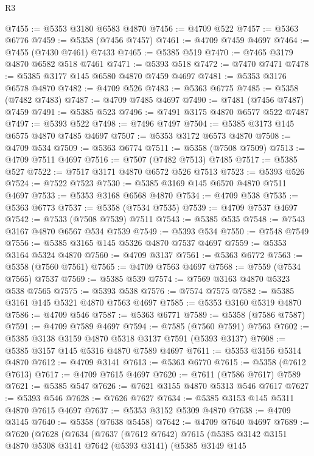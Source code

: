 \begin{lexlean}{R3}
\begin{coremodule}
@7455 := @5353 @3180 @6583 @4870
@7456 := @4709 @522
@7457 := @5363 @6776
@7459 := @5358 (@7456 @7457)
@7461 := @4709 @7459 @4697
@7464 := @7455 (@7430 @7461) @7433
@7465 := @5385 @519
@7470 := @7465 @3179 @4870 @6582 @518 @7461
@7471 := @5393 @518
@7472 := @7470 @7471
@7478 := @5385 @3177 @145 @6580 @4870 @7459 @4697
@7481 := @5353 @3176 @6578 @4870
@7482 := @4709 @526
@7483 := @5363 @6775
@7485 := @5358 (@7482 @7483)
@7487 := @4709 @7485 @4697
@7490 := @7481 (@7456 @7487) @7459
@7491 := @5385 @523
@7496 := @7491 @3175 @4870 @6577 @522 @7487
@7497 := @5393 @522
@7498 := @7496 @7497
@7504 := @5385 @3173 @145 @6575 @4870 @7485 @4697
@7507 := @5353 @3172 @6573 @4870
@7508 := @4709 @534
@7509 := @5363 @6774
@7511 := @5358 (@7508 @7509)
@7513 := @4709 @7511 @4697
@7516 := @7507 (@7482 @7513) @7485
@7517 := @5385 @527
@7522 := @7517 @3171 @4870 @6572 @526 @7513
@7523 := @5393 @526
@7524 := @7522 @7523
@7530 := @5385 @3169 @145 @6570 @4870 @7511 @4697
@7533 := @5353 @3168 @6568 @4870
@7534 := @4709 @538
@7535 := @5363 @6773
@7537 := @5358 (@7534 @7535)
@7539 := @4709 @7537 @4697
@7542 := @7533 (@7508 @7539) @7511
@7543 := @5385 @535
@7548 := @7543 @3167 @4870 @6567 @534 @7539
@7549 := @5393 @534
@7550 := @7548 @7549
@7556 := @5385 @3165 @145 @5326 @4870 @7537 @4697
@7559 := @5353 @3164 @5324 @4870
@7560 := @4709 @3137
@7561 := @5363 @6772
@7563 := @5358 (@7560 @7561)
@7565 := @4709 @7563 @4697
@7568 := @7559 (@7534 @7565) @7537
@7569 := @5385 @539
@7574 := @7569 @3163 @4870 @5323 @538 @7565
@7575 := @5393 @538
@7576 := @7574 @7575
@7582 := @5385 @3161 @145 @5321 @4870 @7563 @4697
@7585 := @5353 @3160 @5319 @4870
@7586 := @4709 @546
@7587 := @5363 @6771
@7589 := @5358 (@7586 @7587)
@7591 := @4709 @7589 @4697
@7594 := @7585 (@7560 @7591) @7563
@7602 := @5385 @3138 @3159 @4870 @5318 @3137 @7591 (@5393 @3137)
@7608 := @5385 @3157 @145 @5316 @4870 @7589 @4697
@7611 := @5353 @3156 @5314 @4870
@7612 := @4709 @3141
@7613 := @5363 @6770
@7615 := @5358 (@7612 @7613)
@7617 := @4709 @7615 @4697
@7620 := @7611 (@7586 @7617) @7589
@7621 := @5385 @547
@7626 := @7621 @3155 @4870 @5313 @546 @7617
@7627 := @5393 @546
@7628 := @7626 @7627
@7634 := @5385 @3153 @145 @5311 @4870 @7615 @4697
@7637 := @5353 @3152 @5309 @4870
@7638 := @4709 @3145
@7640 := @5358 (@7638 @5458)
@7642 := @4709 @7640 @4697
@7689 := @7620
    (@7628
      (@7634
        (@7637
          (@7612 @7642)
          @7615
          (@5385
            @3142
            @3151
            @4870
            @5308
            @3141
            @7642
            (@5393 @3141)
            (@5385
              @3149
              @145

\end{coremodule}
\end{lexlean}
